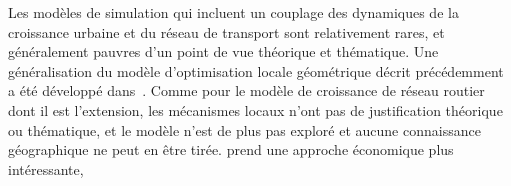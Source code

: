 {}{
Les modèles de simulation qui incluent un couplage des dynamiques de la croissance urbaine et du réseau de transport sont relativement rares, et généralement pauvres d'un point de vue théorique et thématique. 
Une généralisation du modèle d'optimisation locale géométrique décrit précédemment a été développé dans~\cite{barthelemy2009co}. Comme pour le modèle de croissance de réseau routier dont il est l'extension, les mécanismes locaux n'ont pas de justification théorique ou thématique, et le modèle n'est de plus pas exploré et aucune connaissance géographique ne peut en être tirée. \cite{levinson2007co} prend une approche économique plus intéressante, 
}
